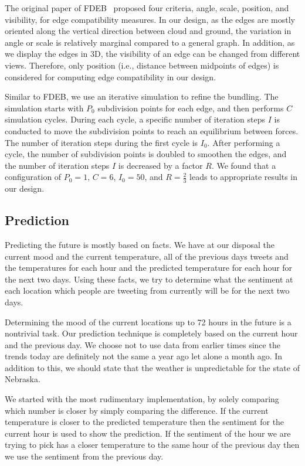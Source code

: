 The original paper of FDEB~\cite{holten2009force} proposed four criteria, angle, scale, position, and visibility, for edge compatibility measures. In our design, as the edges are mostly oriented along the vertical direction between cloud and ground, the variation in angle or scale is relatively marginal compared to a general graph. In addition, as we display the edges in 3D, the visibility of an edge can be changed from different views. Therefore, only position (i.e., distance between midpoints of edges) is considered for computing edge compatibility in our design.

Similar to FDEB, we use an iterative simulation to refine the bundling. The simulation starts with $P_0$ subdivision points for each edge, and then performs $C$ simulation cycles. During each cycle, a specific number of iteration steps $I$ is conducted to move the subdivision points to reach an equilibrium between forces. The number of iteration steps during the first cycle is $I_0$. After performing a cycle, the number of subdivision points is doubled to smoothen the edges, and the number of iteration steps $I$ is decreased by a factor $R$. We found that a configuration of $P_0=1$, $C=6$, $I_0=50$, and $R=\frac{2}{3}$ leads to appropriate results in our design.


\subsection{Prediction}
\label{sec:pred}

Predicting the future is mostly based on facts. We have at our disposal the current mood and the current temperature, all of the previous days tweets and the temperatures for each hour and the predicted temperature for each hour for the next two days. Using these facts, we try to determine what the sentiment at each location which people are tweeting from currently will be for the next two days.

Determining the mood of the current locations up to 72 hours in the future is a nontrivial task. Our prediction technique is completely based on the current hour and the previous day. We choose not to use data from earlier times since the trends today are definitely not the same a year ago let alone a month ago. In addition to this, we should state that the weather is unpredictable for the state of Nebraska.

We started with the most rudimentary implementation, by solely comparing which number is closer by simply comparing the difference. If the current temperature is closer to the predicted temperature then the sentiment for the current hour is used to show the prediction. If the sentiment of the hour we are trying to pick has a closer temperature to the same hour of the previous day then we use the sentiment from the previous day.

